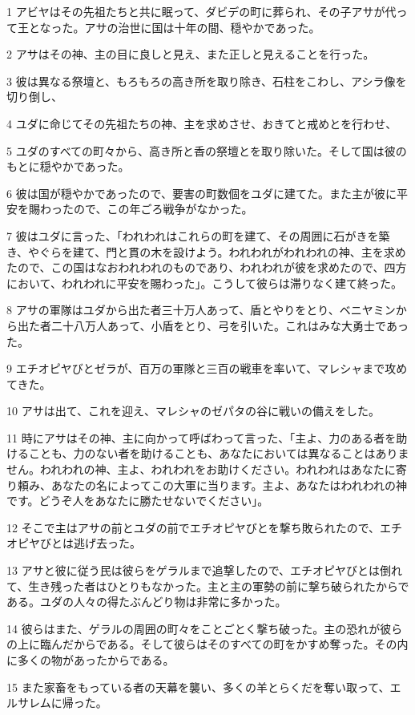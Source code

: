 \par 1 アビヤはその先祖たちと共に眠って、ダビデの町に葬られ、その子アサが代って王となった。アサの治世に国は十年の間、穏やかであった。
\par 2 アサはその神、主の目に良しと見え、また正しと見えることを行った。
\par 3 彼は異なる祭壇と、もろもろの高き所を取り除き、石柱をこわし、アシラ像を切り倒し、
\par 4 ユダに命じてその先祖たちの神、主を求めさせ、おきてと戒めとを行わせ、
\par 5 ユダのすべての町々から、高き所と香の祭壇とを取り除いた。そして国は彼のもとに穏やかであった。
\par 6 彼は国が穏やかであったので、要害の町数個をユダに建てた。また主が彼に平安を賜わったので、この年ごろ戦争がなかった。
\par 7 彼はユダに言った、「われわれはこれらの町を建て、その周囲に石がきを築き、やぐらを建て、門と貫の木を設けよう。われわれがわれわれの神、主を求めたので、この国はなおわれわれのものであり、われわれが彼を求めたので、四方において、われわれに平安を賜わった」。こうして彼らは滞りなく建て終った。
\par 8 アサの軍隊はユダから出た者三十万人あって、盾とやりをとり、ベニヤミンから出た者二十八万人あって、小盾をとり、弓を引いた。これはみな大勇士であった。
\par 9 エチオピヤびとゼラが、百万の軍隊と三百の戦車を率いて、マレシャまで攻めてきた。
\par 10 アサは出て、これを迎え、マレシャのゼパタの谷に戦いの備えをした。
\par 11 時にアサはその神、主に向かって呼ばわって言った、「主よ、力のある者を助けることも、力のない者を助けることも、あなたにおいては異なることはありません。われわれの神、主よ、われわれをお助けください。われわれはあなたに寄り頼み、あなたの名によってこの大軍に当ります。主よ、あなたはわれわれの神です。どうぞ人をあなたに勝たせないでください」。
\par 12 そこで主はアサの前とユダの前でエチオピヤびとを撃ち敗られたので、エチオピヤびとは逃げ去った。
\par 13 アサと彼に従う民は彼らをゲラルまで追撃したので、エチオピヤびとは倒れて、生き残った者はひとりもなかった。主と主の軍勢の前に撃ち破られたからである。ユダの人々の得たぶんどり物は非常に多かった。
\par 14 彼らはまた、ゲラルの周囲の町々をことごとく撃ち破った。主の恐れが彼らの上に臨んだからである。そして彼らはそのすべての町をかすめ奪った。その内に多くの物があったからである。
\par 15 また家畜をもっている者の天幕を襲い、多くの羊とらくだを奪い取って、エルサレムに帰った。


